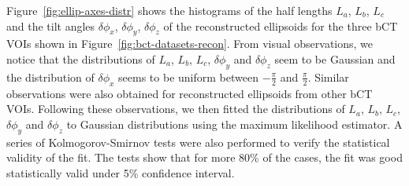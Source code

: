\documentclass[journal]{IEEEtran}
\begin{document}
Figure~\ref{fig:ellip-axes-distr} shows the histograms of the half
lengths $L_a$, $L_b$, $L_c$ and the tilt angles $\delta\phi_x$,
$\delta\phi_y$, $\delta\phi_z$ of the reconstructed ellipsoids for the
three bCT VOIs shown in Figure~\ref{fig:bct-datasets-recon}. From
visual observations, we notice that the distributions of $L_a$, $L_b$,
$L_c$, $\delta\phi_y$ and $\delta\phi_z$ seem to be Gaussian and the
distribution of $\delta\phi_x$ seems to be uniform between
$-\frac{\pi}{2}$ and $\frac{\pi}{2}$. Similar observations were also
obtained for reconstructed ellipsoids from other bCT VOIs. Following
these observations, we then fitted the distributions of $L_a$, $L_b$,
$L_c$, $\delta\phi_y$ and $\delta\phi_z$ to Gaussian distributions
using the maximum likelihood estimator. A series of Kolmogorov-Smirnov
tests were also performed to verify the statistical validity of the
fit. The tests show that for more 80\% of the cases, the fit was good
statistically valid under 5\% confidence interval.
\end{document}
